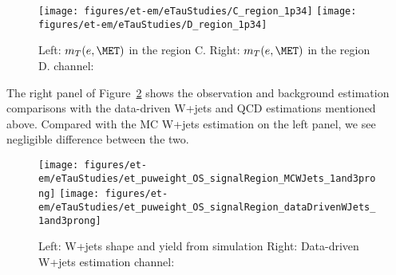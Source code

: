\begin{table}[ht]
\begin{center}
\begin{tabular}{| l | c | c | c | c |}
 \hline
 \end{tabular}
\end{center}
\end{table}

\begin{figure}\centering
 \texttt{[image: figures/et-em/eTauStudies/C\_region\_1p34]}
 \texttt{[image: figures/et-em/eTauStudies/D\_region\_1p34]}
 \caption{\label{fig:WJets_C_D} Left: $m_{T}(e,\MET)$ in the region C.
   Right: $m_{T}(e,\MET)$ in the region D.
   channel: \meffetau}
\end{figure}

The right panel of Figure~\ref{fig:dataDrivenWJets} shows the observation and background 
estimation comparisons with the data-driven W+jets and QCD estimations mentioned above. Compared 
with the MC W+jets estimation on the left panel, we see negligible difference between the 
two.

\begin{figure}\centering
  \texttt{[image: figures/et-em/eTauStudies/et\_puweight\_OS\_signalRegion\_MCWJets\_1and3prong]}
  \texttt{[image: figures/et-em/eTauStudies/et\_puweight\_OS\_signalRegion\_dataDrivenWJets\_1and3prong]}
  \caption{\label{fig:dataDrivenWJets} Left: W+jets shape and yield from simulation
    Right: Data-driven W+jets estimation \teth
    channel: \meffetau}
\end{figure}

